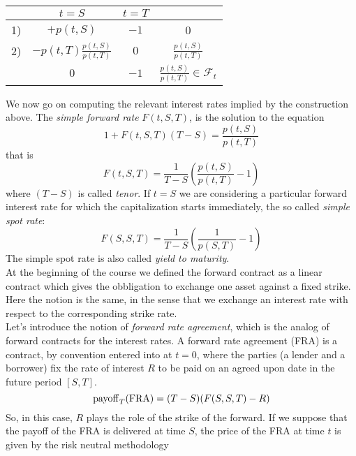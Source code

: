 \begin{center}
    \begin{tabular}{lccc}
        \toprule
           & $t=S$ & $t=T$ \\\midrule
        1) & $+p(t,S)$ & $-1$ & 0 \\
        2) & $-p(t,T)\tfrac{p(t,S)}{p(t,T)}$ & $0$ & $\tfrac{p(t,S)}{p(t,T)}$ \\
        \midrule\midrule
           & $0$ & $-1$ & $\tfrac{p(t,S)}{p(t,T)}\in\mathcal{F}_t$ \\\bottomrule
    \end{tabular}
\end{center}
We now go on computing the relevant interest rates implied by the construction above. The \emph{simple forward rate} $F(t,S,T)$, is the solution to the equation
\begin{equation}
    1 + F(t,S,T)(T-S) = \frac{p(t,S)}{p(t,T)}
\end{equation}
that is
\begin{equation}
    F(t,S,T) = \frac{1}{T-S}\left(\frac{p(t,S)}{p(t,T)}-1\right)
\end{equation}
where $(T-S)$ is called \emph{tenor}. If $t=S$ we are considering a particular forward interest rate for which the capitalization starts immediately, the so called \emph{simple spot rate}:
\begin{equation}
    F(S,S,T) = \frac{1}{T-S}\left(\frac{1}{p(S,T)}-1\right)
\end{equation}
The simple spot rate is also called \emph{yield to maturity}.\\
At the beginning of the course we defined the forward contract as a linear contract which gives the obbligation to exchange one asset against a fixed strike. Here the notion is the same, in the sense that we exchange an interest rate with respect to the corresponding strike rate.\\
Let's introduce the notion of \emph{forward rate agreement}, which is the analog of forward contracts for the interest rates. A forward rate agreement (FRA) is a contract, by convention entered into at $t = 0$, where the parties (a lender and a borrower) fix the rate of interest $R$ to be paid on an agreed upon date in the future period $[S,T]$.
\begin{equation}
    \operatorname{payoff}_T(\text{FRA}) = (T-S)(F(S,S,T)-R)
\end{equation}
So, in this case, $R$ plays the role of the strike of the forward. If we suppose that the payoff of the FRA is delivered at time $S$, the price of the FRA at time $t$ is given by the risk neutral methodology
